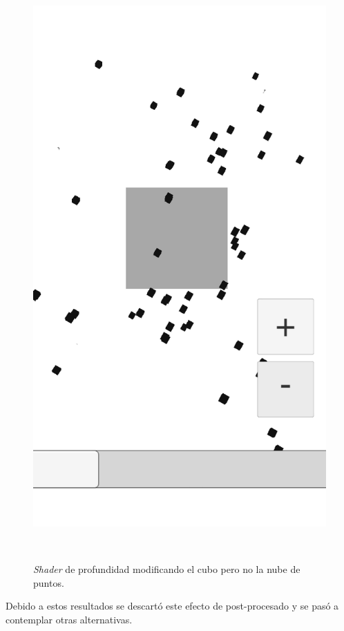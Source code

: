 \begin{figure}[H]
\begin{minipage}{0.5\textwidth}
        \includegraphics[scale=0.2]{Images/Shaders/profundidad (5).png}\\
    \end{minipage}\\
    \caption[\textit{Shader} de profundidad modificando el cubo pero no la nube de puntos]{\textit{Shader} de profundidad modificando el cubo pero no la nube de puntos.}
    \label{fig:shaderprofp2}
\end{figure}

Debido a estos resultados se descartó este efecto de post-procesado y se pasó a contemplar otras alternativas. 